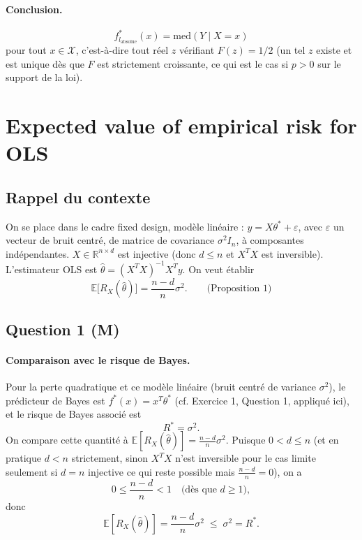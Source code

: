 \documentclass[11pt]{article}
\theoremstyle{remark}
\newcommand{\X}{\mathcal{X}}
\newcommand{\E}{\mathbb{E}}
\newcommand{\R}{\mathbb{R}}
\begin{document}
	\paragraph{Conclusion.}
	\[
	\boxed{f^*_{l_{\text{absolue}}}(x) = \mathrm{med}(Y \mid X = x)}
	\]
	pour tout $x \in \X$, c'est-à-dire tout réel $z$ vérifiant $F(z) = 1/2$ (un tel $z$ existe et est unique dès que $F$ est strictement croissante, ce qui est le cas si $p > 0$ sur le support de la loi).
	
	\section{Expected value of empirical risk for OLS}
	
	\subsection*{Rappel du contexte}
	
	On se place dans le cadre fixed design, modèle linéaire : $y = X\theta^* + \varepsilon$, avec $\varepsilon$ un vecteur de bruit centré, de matrice de covariance $\sigma^2 I_n$, à composantes indépendantes. $X \in \R^{n \times d}$ est injective (donc $d \leq n$ et $X^TX$ est inversible). L'estimateur OLS est $\hat\theta = (X^TX)^{-1}X^Ty$. On veut établir
	\[
	\E\big[R_X(\hat\theta)\big] = \frac{n-d}{n}\sigma^2. \qquad \text{(Proposition 1)}
	\]
	
	\subsection*{Question 1 (M)}
	
	\paragraph{Comparaison avec le risque de Bayes.}
	Pour la perte quadratique et ce modèle linéaire (bruit centré de variance $\sigma^2$), le prédicteur de Bayes est $f^*(x) = x^T\theta^*$ (cf. Exercice 1, Question 1, appliqué ici), et le risque de Bayes associé est
	\[
	R^* = \sigma^2.
	\]
	On compare cette quantité à $\E[R_X(\hat\theta)] = \frac{n-d}{n}\sigma^2$. Puisque $0 < d \leq n$ (et en pratique $d<n$ strictement, sinon $X^TX$ n'est inversible pour le cas limite seulement si $d=n$ injective ce qui reste possible mais $\frac{n-d}{n}=0$), on a
	\[
	0 \leq \frac{n-d}{n} < 1 \quad \text{(dès que } d \geq 1\text{)},
	\]
	donc
	\[
	\boxed{\E[R_X(\hat\theta)] = \frac{n-d}{n}\sigma^2 \;\leq\; \sigma^2 = R^*}.
	\]
	
\end{document}
